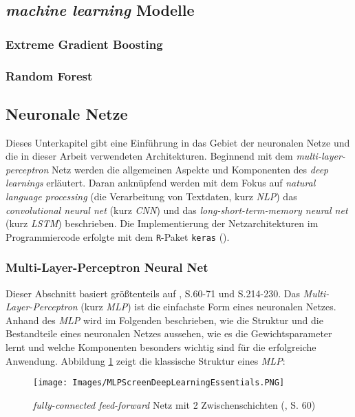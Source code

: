 \documentclass[a4paper,11pt]{article}
\begin{document}
\subsection{\textit{machine learning} Modelle}\label{kap:machineLearning}

\subsubsection{Extreme Gradient Boosting}\label{kap:XG}
\subsubsection{Random Forest}\label{kap:RF}

\subsection{Neuronale Netze} \label{kap:neuralNets}

Dieses Unterkapitel gibt eine Einführung in das Gebiet der neuronalen Netze und die in dieser Arbeit verwendeten Architekturen. Beginnend mit dem \textit{multi-layer-perceptron} Netz werden die allgemeinen Aspekte und Komponenten des \textit{deep learnings} erläutert. Daran anknüpfend werden mit dem Fokus auf \textit{natural language processing} (die Verarbeitung von Textdaten, kurz \textit{NLP}) das \textit{convolutional neural net} (kurz \textit{CNN}) und das \textit{long-short-term-memory neural net} (kurz \textit{LSTM}) beschrieben. Die Implementierung der Netzarchitekturen im Programmiercode erfolgte mit dem \texttt{R}-Paket \texttt{keras} (\cite{kerasR}).


\subsubsection{Multi-Layer-Perceptron Neural Net}

Dieser Abschnitt basiert größtenteils auf \cite{deepEssentials}, S.60-71 und S.214-230.
Das \textit{Multi-Layer-Perceptron} (kurz \textit{MLP}) ist die einfachste Form eines neuronalen Netzes. Anhand des \textit{MLP} wird im Folgenden beschrieben, wie die Struktur und die Bestandteile eines neuronalen Netzes aussehen, wie es die Gewichtsparameter lernt und welche Komponenten besonders wichtig sind für die erfolgreiche Anwendung. Abbildung \ref{abb:MLPScreen} zeigt die klassische Struktur eines \textit{MLP}:


\begin{figure}[!ht]
\begin{center}
\texttt{[image: Images/MLPScreenDeepLearningEssentials.PNG]}
\caption{\textit{fully-connected feed-forward} Netz mit 2 Zwischenschichten (\cite{deepEssentials}, S. 60)}
\label{abb:MLPScreen}
\end{center}
\end{figure}
\end{document}
